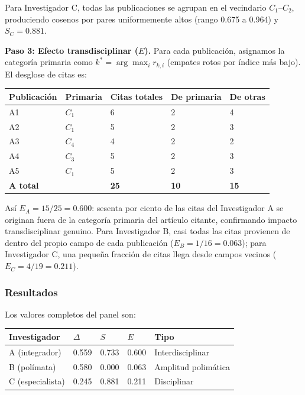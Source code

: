 \documentclass[
]{article}
\begin{document}
Para Investigador C, todas las publicaciones se agrupan en el vecindario
\(C_1\)--\(C_2\), produciendo cosenos por pares uniformemente altos
(rango 0.675 a 0.964) y \(S_C = 0.881\).

\textbf{Paso 3: Efecto transdisciplinar (\(E\)).} Para cada publicación,
asignamos la categoría primaria como \(k^* = \arg\max_i r_{k,i}\)
(empates rotos por índice más bajo). El desglose de citas es:

\begin{longtable}[]{@{}lllll@{}}
\toprule
Publicación & Primaria & Citas totales & De primaria & De otras \\
\midrule
\endhead
A1 & \(C_1\) & 6 & 2 & 4 \\
A2 & \(C_1\) & 5 & 2 & 3 \\
A3 & \(C_4\) & 4 & 2 & 2 \\
A4 & \(C_3\) & 5 & 2 & 3 \\
A5 & \(C_1\) & 5 & 2 & 3 \\
\textbf{A total} & & \textbf{25} & \textbf{10} & \textbf{15} \\
\bottomrule
\end{longtable}

Así \(E_A = 15/25 = 0.600\): sesenta por ciento de las citas del
Investigador A se originan fuera de la categoría primaria del artículo
citante, confirmando impacto transdisciplinar genuino. Para Investigador
B, casi todas las citas provienen de dentro del propio campo de cada
publicación (\(E_B = 1/16 = 0.063\)); para Investigador C, una pequeña
fracción de citas llega desde campos vecinos (\(E_C = 4/19 = 0.211\)).

\hypertarget{resultados}{%
\subsubsection{Resultados}\label{resultados}}

Los valores completos del panel son:

\begin{longtable}[]{@{}lllll@{}}
\toprule
Investigador & \(\Delta\) & \(S\) & \(E\) & Tipo \\
\midrule
\endhead
A (integrador) & 0.559 & 0.733 & 0.600 & Interdisciplinar \\
B (polímata) & 0.580 & 0.000 & 0.063 & Amplitud polimática \\
C (especialista) & 0.245 & 0.881 & 0.211 & Disciplinar \\
\bottomrule
\end{longtable}
\end{document}
